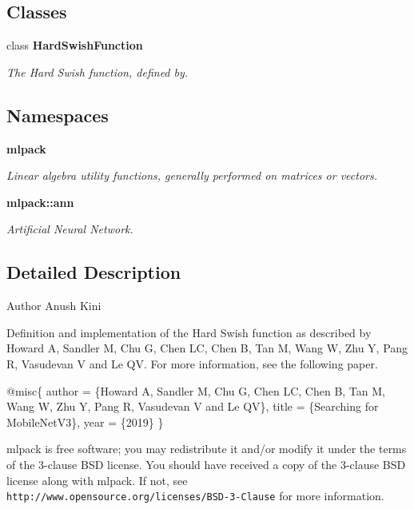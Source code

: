 \subsection*{Classes}
\begin{DoxyCompactItemize}
\item 
class \textbf{ Hard\+Swish\+Function}
\begin{DoxyCompactList}\small\item\em The Hard Swish function, defined by. \end{DoxyCompactList}\end{DoxyCompactItemize}
\subsection*{Namespaces}
\begin{DoxyCompactItemize}
\item 
 \textbf{ mlpack}
\begin{DoxyCompactList}\small\item\em Linear algebra utility functions, generally performed on matrices or vectors. \end{DoxyCompactList}\item 
 \textbf{ mlpack\+::ann}
\begin{DoxyCompactList}\small\item\em Artificial Neural Network. \end{DoxyCompactList}\end{DoxyCompactItemize}


\subsection{Detailed Description}
\begin{DoxyAuthor}{Author}
Anush Kini
\end{DoxyAuthor}
Definition and implementation of the Hard Swish function as described by Howard A, Sandler M, Chu G, Chen LC, Chen B, Tan M, Wang W, Zhu Y, Pang R, Vasudevan V and Le QV. For more information, see the following paper.


\begin{DoxyCode}
@misc\{
  author = \{Howard A, Sandler M, Chu G, Chen LC, Chen B, Tan M, Wang W,
           Zhu Y, Pang R, Vasudevan V and Le QV\},
  title = \{Searching \textcolor{keywordflow}{for} MobileNetV3\},
  year = \{2019\}
\}
\end{DoxyCode}


mlpack is free software; you may redistribute it and/or modify it under the terms of the 3-\/clause B\+SD license. You should have received a copy of the 3-\/clause B\+SD license along with mlpack. If not, see {\tt http\+://www.\+opensource.\+org/licenses/\+B\+S\+D-\/3-\/\+Clause} for more information. 